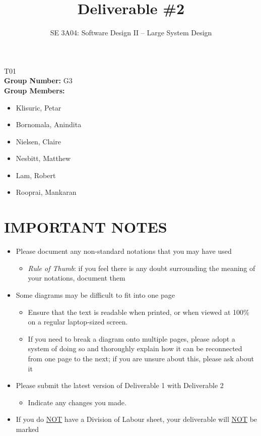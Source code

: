 \documentclass[]{article}
\title{Deliverable \#2}
\author{SE 3A04: Software Design II -- Large System Design}
\date{}
\begin{document}
\maketitle	
{} T01\\
{\bf Group Number:} G3 \\
{\bf Group Members:} 
\begin{itemize}
    \item Klisuric, Petar
    \item Bornomala, Anindita
    \item Nielsen, Claire
    \item Nesbitt, Matthew
    \item Lam, Robert 
    \item Rooprai, Mankaran
\end{itemize}

\section*{IMPORTANT NOTES}
\begin{itemize}
	\item Please document any non-standard notations that you may have used
	\begin{itemize}
		\item \emph{Rule of Thumb}: if you feel there is any doubt surrounding the meaning of your notations, document them
	\end{itemize}
	\item Some diagrams may be difficult to fit into one page
	\begin{itemize}
		\item Ensure that the text is readable when printed, or when viewed at 100\% on a regular laptop-sized screen.
		\item If you need to break a diagram onto multiple pages, please adopt a system of doing so and thoroughly explain how it can be reconnected from one page to the next; if you are unsure about this, please ask about it
	\end{itemize}
	\item Please submit the latest version of Deliverable 1 with Deliverable 2
	\begin{itemize}
		\item Indicate any changes you made.
	\end{itemize}
	\item If you do \underline{NOT} have a Division of Labour sheet, your deliverable will \underline{NOT} be marked
\end{itemize}
\end{document}
